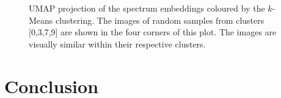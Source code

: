 \documentclass[a4paper,12pt]{article}
\begin{document}
\begin{figure}[H]
    \centering
    \caption{UMAP projection of the spectrum embeddings coloured by the $k$-Means clustering. The images of random samples from clusters [0,3,7,9] are shown in the four corners of this plot. The images are visually similar within their respective clusters.}
    \label{fig:annotated_images}

    
\end{figure}




\section{Conclusion}
\end{document}
